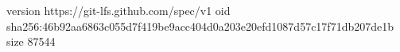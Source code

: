 version https://git-lfs.github.com/spec/v1
oid sha256:46b92aa6863c055d7f419be9acc404d0a203e20efd1087d57c17f71db207de1b
size 87544
